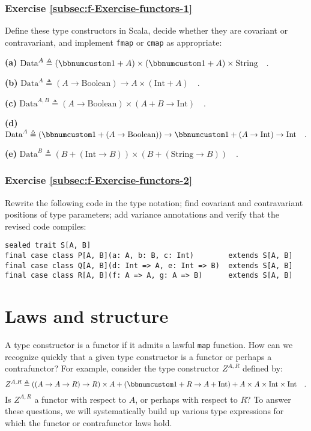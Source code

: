 \subsubsection{Exercise \label{subsec:f-Exercise-functors-1}\ref{subsec:f-Exercise-functors-1}}

Define these type constructors in Scala, decide whether they are covariant
or contravariant, and implement \lstinline!fmap! or \lstinline!cmap!
as appropriate:

\textbf{(a)} $\text{Data}^{A}\triangleq\left(\bbnum 1+A\right)\times\left(\bbnum 1+A\right)\times\text{String}\quad.$

\textbf{(b)} $\text{Data}^{A}\triangleq(A\rightarrow\text{Boolean})\rightarrow A\times\left(\text{Int}+A\right)\quad.$

\textbf{(c)} $\text{Data}^{A,B}\triangleq(A\rightarrow\text{Boolean})\times\left(A+B\rightarrow\text{Int}\right)\quad.$

\textbf{(d)} $\text{Data}^{A}\triangleq(\bbnum 1+(A\rightarrow\text{Boolean}))\rightarrow\bbnum 1+(A\rightarrow\text{Int})\rightarrow\text{Int}\quad.$

\textbf{(e)} $\text{Data}^{B}\triangleq(B+(\text{Int}\rightarrow B))\times(B+(\text{String}\rightarrow B))\quad.$

\subsubsection{Exercise \label{subsec:f-Exercise-functors-2}\ref{subsec:f-Exercise-functors-2}}

Rewrite the following code in the type notation; find covariant and
contravariant positions of type parameters; add variance annotations
and verify that the revised code compiles:

\begin{lstlisting}
sealed trait S[A, B]
final case class P[A, B](a: A, b: B, c: Int)        extends S[A, B]
final case class Q[A, B](d: Int => A, e: Int => B)  extends S[A, B]
final case class R[A, B](f: A => A, g: A => B)      extends S[A, B]
\end{lstlisting}


\section{Laws and structure\label{sec:f-Laws-and-structure}}

A type constructor is a functor if it admits a lawful \lstinline!map!
function. How can we recognize quickly that a given type constructor
is a functor or perhaps a contrafunctor? For example, consider the
type constructor $Z^{A,R}$ defined by: 
\begin{equation}
Z^{A,R}\triangleq\left(\left(A\rightarrow A\rightarrow R\right)\rightarrow R\right)\times A+\left(\bbnum 1+R\rightarrow A+\text{Int}\right)+A\times A\times\text{Int}\times\text{Int}\quad.\label{eq:f-example-complicated-z}
\end{equation}
Is $Z^{A,R}$ a functor with respect to $A$, or perhaps with respect
to $R$? To answer these questions, we will systematically build up
various type expressions for which the functor or contrafunctor laws
hold. 

